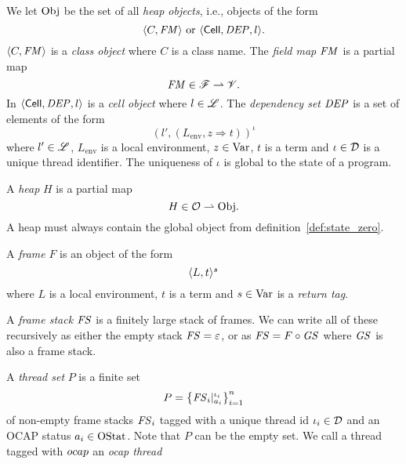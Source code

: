 \begin{definition}\label{def:heap_obj}
  We let $\mathrm{Obj}$ be the set of all \emph{heap objects}, i.e., objects of the
  form
  \begin{equation*}
    \mbox{$\langle C, \mathit{FM} \rangle$} \text{ or } \mbox{$\langle \mbox{$\mathsf{Cell}$}{}, \mathit{DEP}, l \rangle$}.
  \end{equation*}
  $\mbox{$\langle C, \mathit{FM} \rangle$}$ is a \emph{class object} where $C$ is a class name. The \emph{field
  map} $\mathit{FM}$ is a partial map
  \begin{equation*}
    \mathit{FM} \in \mathscr{F} \rightharpoonup \mathscr{V}.
  \end{equation*}
  In $\mbox{$\langle \mbox{$\mathsf{Cell}$}{}, \mathit{DEP}, l \rangle$}$ is a \emph{cell object} where $l \in \mbox{$\mathscr{L}$}$. The
  \emph{dependency set} $\mathit{DEP}$ is a set of elements of the form
  \begin{equation*}
    (l' , (L_{\text{env}}, z \Rightarrow t))^\iota
  \end{equation*}
  where $l' \in \mbox{$\mathscr{L}$}$, $L_{\text{env}}$ is a local environment, $z \in
  \mathrm{Var}$, $t$ is a term and $\iota \in \mathcal{D}$ is a unique thread identifier. The
  uniqueness of $\iota$ is global to the state of a program.
\end{definition}

\begin{definition}
  A \emph{heap} $H$ is a partial map
  \begin{equation*}
    H \in \mathcal{O} \rightharpoonup \mathrm{Obj}.
  \end{equation*}
  A heap must always contain the global object from
  definition~\ref{def:state_zero}.
\end{definition}

\begin{definition}\label{def:thread_sets}
  A \emph{frame} $F$ is an object of the form
  \begin{equation*}
    \mbox{$\langle L, t \rangle^s$}
  \end{equation*}
  where $L$ is a local environment, $t$ is a term and $s \in \mathrm{Var}$ is a
  \emph{return tag}.

  A \emph{frame stack} $\mathit{FS}$ is a finitely large stack of frames. We can write
  all of these recursively as either the empty stack $\mathit{FS} = \varepsilon$, or as
  $\mathit{FS} = F \circ \mathit{GS}$ where $\mathit{GS}$ is also a frame stack.

  A \emph{thread set} $P$ is a finite set 
  \begin{equation*}
    P = \left\{ \mathit{FS}_i|_{a_i}^{\iota_i} \right\}_{i = 1}^{n}
  \end{equation*}
  of non-empty frame stacks $\mathit{FS}_i$ tagged with a unique thread id $\iota_i \in \mathcal{D}$ and an
  OCAP status $a_i \in \mathrm{OStat}$. Note that $P$ can be the empty set. We call
  a thread tagged with $\mbox{$ocap$}$ an \emph{ocap thread}
\end{definition}

